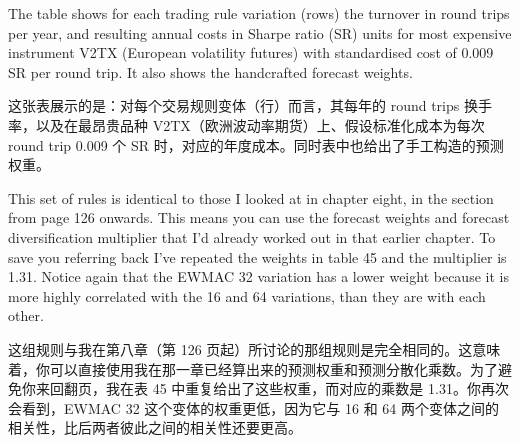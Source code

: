 \begin{englishblock} The table shows for each trading rule variation (rows) the turnover in round trips per year, and resulting annual costs in Sharpe ratio (SR) units for most expensive instrument V2TX (European volatility futures) with standardised cost of 0.009 SR per round trip. It also shows the handcrafted forecast weights. \end{englishblock}

\begin{chineseblock}这张表展示的是：对每个交易规则变体（行）而言，其每年的 round trips 换手率，以及在最昂贵品种 V2TX（欧洲波动率期货）上、假设标准化成本为每次 round trip 0.009 个 SR 时，对应的年度成本。同时表中也给出了手工构造的预测权重。\end{chineseblock}

\bipairgap

\begin{englishblock} This set of rules is identical to those I looked at in chapter eight, in the section from page 126 onwards. This means you can use the forecast weights and forecast diversification multiplier that I'd already worked out in that earlier chapter. To save you referring back I've repeated the weights in table 45 and the multiplier is 1.31. Notice again that the EWMAC 32 variation has a lower weight because it is more highly correlated with the 16 and 64 variations, than they are with each other. \end{englishblock}

\begin{chineseblock}这组规则与我在第八章（第 126 页起）所讨论的那组规则是完全相同的。这意味着，你可以直接使用我在那一章已经算出来的预测权重和预测分散化乘数。为了避免你来回翻页，我在表 45 中重复给出了这些权重，而对应的乘数是 1.31。你再次会看到，EWMAC 32 这个变体的权重更低，因为它与 16 和 64 两个变体之间的相关性，比后两者彼此之间的相关性还要更高。\end{chineseblock}


